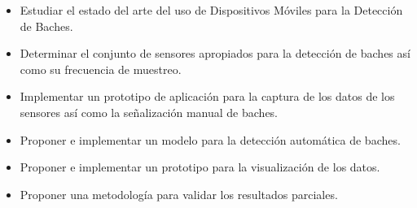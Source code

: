 \begin{itemize}
	\item Estudiar el estado del arte del uso de Dispositivos Móviles para la Detección de Baches.
	\item Determinar el conjunto de sensores apropiados para la detección de baches así como su frecuencia de muestreo.
	\item Implementar un prototipo de aplicación para la captura de los datos de los sensores así como la señalización
		manual de baches.
	\item Proponer e implementar un modelo para la detección automática de baches.
	\item Proponer e implementar un prototipo para la visualización de los datos.
	\item Proponer una metodología para validar los resultados parciales.
\end{itemize}
